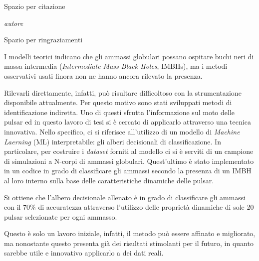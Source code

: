 \documentclass[corpo=12pt,numerazioneromana]{toptesi}
\begin{document}
\begin{flushright}
\noindent
Spazio per citazione

\textit{autore}
\end{flushright}
\cleardoublepage


\ringraziamenti
Spazio per ringraziamenti


\sommario
I modelli teorici indicano che gli ammassi globulari possano ospitare buchi neri di massa intermedia (\textit{Intermediate-Mass Black Holes}, IMBHs), ma i metodi osservativi usati finora non ne hanno ancora rilevato la presenza.

Rilevarli direttamente, infatti, può risultare difficoltoso con la strumentazione disponibile attualmente. Per questo motivo sono stati sviluppati metodi di identificazione indiretta. Uno di questi sfrutta l'informazione sul moto delle pulsar \cite{abbate1:paper} ed in questo lavoro di tesi si è cercato di applicarlo attraverso una tecnica innovativa. Nello specifico, ci si riferisce all'utilizzo di un modello di \textit{Machine Laerning} (ML) interpretabile: gli alberi decisionali di classificazione. In particolare, per costruire i \textit{dataset} forniti al modello ci si è serviti di un campione di simulazioni a N-corpi di ammassi globulari. Quest'ultimo è stato implementato in un codice in grado di classificare gli ammassi secondo la presenza di un IMBH al loro interno sulla base delle caratteristiche dinamiche delle pulsar. 

Si ottiene che l'albero decisionale allenato è in grado di classificare gli ammassi con il $70\%$ di accuratezza attraverso l'utilizzo delle proprietà dinamiche di sole 20 pulsar selezionate per ogni ammasso. 

Questo è solo un lavoro iniziale, infatti, il metodo può essere affinato e migliorato, ma nonostante questo presenta già dei risultati stimolanti per il futuro, in quanto sarebbe utile e innovativo applicarlo a dei dati reali.

\end{document}
